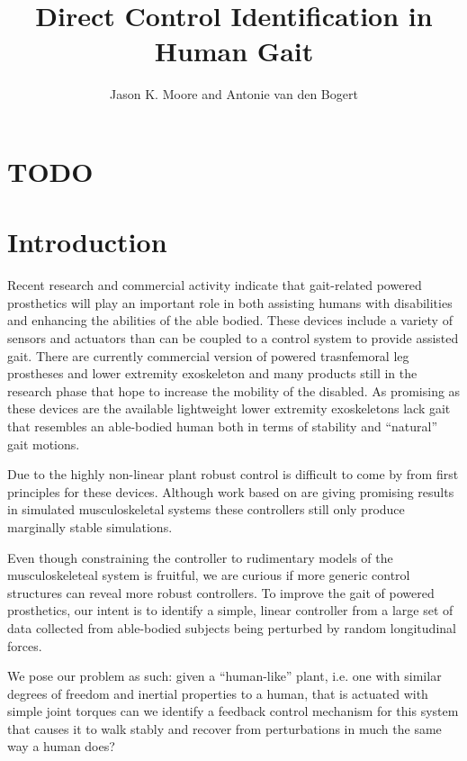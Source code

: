 \documentclass{article}
\author{Jason K. Moore and Antonie van den Bogert}
\title{Direct Control Identification in Human Gait}
\date{}
\begin{document}
\maketitle

\section*{TODO}

\listoftodos

\begin{abstract}
\end{abstract}

\section*{Introduction}
%
Recent research and commercial activity indicate that gait-related powered
prosthetics will play an important role in both assisting humans with
disabilities and enhancing the abilities of the able bodied. These devices
include a variety of sensors and actuators than can be coupled to a control
system to provide assisted gait. There are currently commercial version of
powered trasnfemoral leg prostheses \cite{BiOM} and lower extremity exoskeleton
\cite{ReWalk} and many products still in the research phase
\cite{Ekso,Parker,Goldfarb,etc} that hope to increase the mobility of the
disabled. As promising as these devices are the available
lightweight lower extremity exoskeletons lack gait that resembles an
able-bodied human both in terms of stability and ``natural'' gait motions.

Due to the highly non-linear plant robust control is difficult to come by from
first principles for these devices. Although work based on \cite{Geyer2010} are
giving promising results in simulated musculoskeletal systems \cite{Wang2012,
Geitenbeek2013} these controllers still only produce marginally stable
simulations.

Even though constraining the controller to rudimentary models of the
musculoskeleteal system is fruitful, we are curious if more generic control
structures can reveal more robust controllers. To improve the gait of powered
prosthetics, our intent is to identify a simple, linear controller from a large
set of data collected from able-bodied subjects being perturbed by random
longitudinal forces.

We pose our problem as such: given a ``human-like'' plant, i.e. one with
similar degrees of freedom and inertial properties to a human, that is actuated
with simple joint torques can we identify a feedback control mechanism for this
system that causes it to walk stably and recover from perturbations in much the
same way a human does?
\end{document}
